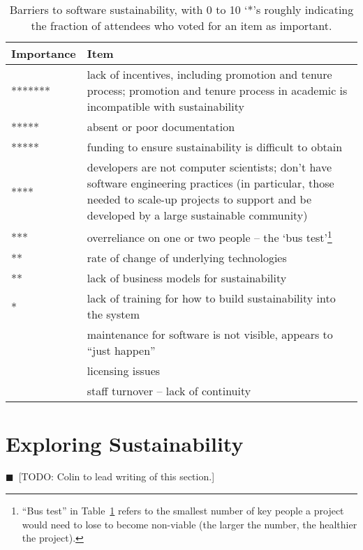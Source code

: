 \documentclass[11pt, oneside]{amsart}
\newcommand{\todo}[1]{{\color{blue}$\blacksquare$~\textsf{[TODO: #1]}}}
\begin{document}
\begin{table}[ht]
\caption{Barriers to software sustainability, with 0 to 10 `*'s roughly
indicating the fraction of attendees who voted for an item as important.}  
\label{tb:software_sustainability_barriers} 
 \centering
  \begin{scriptsize}
  \begin{tabular}{ | p{1.65cm} | p{10.0cm} |}
   \hline
  Importance & Item \\ \hline \hline
******* & lack of incentives, including promotion and tenure process; promotion
and tenure process in academic is incompatible with sustainability \\ \hline
*****  & absent or poor documentation \\ \hline
***** & funding to ensure sustainability is difficult to obtain \\ \hline
**** & developers are not computer scientists; don't have software engineering
practices (in particular, those needed to scale-up projects to support and be
developed by a large sustainable community) \\ \hline
*** & overreliance on one or two people -- the `bus test'\footnote{``Bus test'' in Table~\ref{tb:software_sustainability_barriers} refers to the smallest number of key people a project would need to lose to become non-viable (the larger the number, the healthier the project).} \\ \hline
** & rate of change of underlying technologies \\ \hline
** & lack of business models for sustainability \\ \hline
* & lack of training for how to build sustainability into the system \\ \hline
 & maintenance for software is not visible, appears to ``just happen'' \\ \hline
 & licensing issues \\ \hline
 & staff turnover -- lack of continuity \\ \hline
\end{tabular}
 \end{scriptsize}
\end{table}

\section{Exploring Sustainability} \label{sec:exploring}
\todo{Colin to lead writing of this section.}
\end{document}
